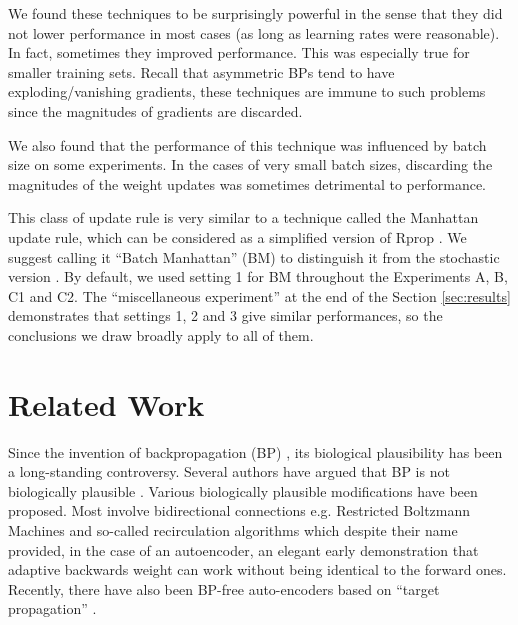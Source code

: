 \documentclass[letterpaper]{article}
\begin{document}
We found these techniques to be surprisingly powerful in the sense that they did not lower performance in most cases (as long as learning rates were reasonable). In fact, sometimes they improved performance. This was especially true for smaller training sets. Recall that asymmetric BPs tend to have exploding/vanishing gradients, these techniques are immune to such problems since the magnitudes of gradients are discarded.

We also found that the performance of this technique was influenced by batch size on some experiments. In the cases of very small batch sizes, discarding the magnitudes of the weight updates was sometimes detrimental to performance.

This class of update rule is very similar to a technique called the Manhattan update rule, which can be considered as a simplified version of Rprop \cite{riedmiller1993direct}. We suggest calling it ``Batch Manhattan'' (BM) to distinguish it from the stochastic version \cite{zamanidoostmanhattan}. By default, we used setting 1 for BM throughout the Experiments A, B, C1 and C2. The ``miscellaneous experiment'' at the end of the Section \ref{sec:results} demonstrates that settings 1, 2 and 3 give similar performances, so the conclusions we draw broadly apply to all of them.


\section{Related Work}

Since the invention of backpropagation (BP) \cite{rumelhart1988learning}, its biological plausibility has been a long-standing controversy.  Several authors have argued that   BP is not biologically plausible \cite{crick1989recent,mazzoni1991more,o1996biologically,chinta2012adaptive,bengio2015towards}. Various biologically plausible modifications have been proposed. Most involve bidirectional connections e.g. Restricted Boltzmann Machines \cite{hinton2006reducing,smolensky1986information} and so-called recirculation algorithms \cite{hinton1988learning,o1996biologically} which despite their name provided,  in the case of an autoencoder, an elegant early demonstration that adaptive backwards weight can work without being identical to the forward ones.  Recently, there have also been BP-free auto-encoders \cite{bengio2014auto} based on ``target propagation'' \cite{le1986learning}.
\end{document}
